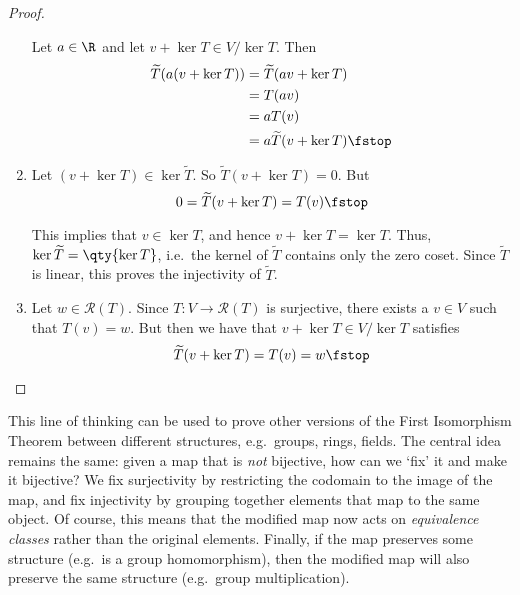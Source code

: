 \begin{proof}
\begin{enumerate}[label=(\roman*)]
     Let \( a\in\R \) and let \( v+\ker T\in V/\ker T \). Then
     \begin{align*}
       \widetilde{T}(a(v+\ker T))&= \widetilde{T}(av+\ker T)\\
       &= T(av)\\
       &= aT(v)\\
       &= a\widetilde{T}(v+\ker T)\fstop
     \end{align*}
   \item Let \( (v+\ker T)\in\ker\widetilde{T} \). So \( \widetilde{T}(v+\ker T)=0 \). But
     \[ 0=\widetilde{T}(v+\ker T)=T(v)\fstop \]

     This implies that \( v\in\ker T \), and hence \( v+\ker T=\ker T \). Thus, \( \ker\widetilde{T}=\qty{\ker T} \), i.e.\ the kernel of \( \widetilde{T} \) contains only the zero coset. Since \( \widetilde{T} \) is linear, this proves the injectivity of \( \widetilde{T} \).
   \item Let \( w\in\mathcal{R}(T) \). Since \( T:V\to\mathcal{R}(T) \) is surjective, there exists a \( v\in V \) such that \( T(v)=w \). But then we have that \( v+\ker T\in V/\ker T \) satisfies
     \[ \widetilde{T}(v+\ker T)=T(v)=w\fstop \]
   \end{enumerate}
 \end{proof}

 This line of thinking can be used to prove other versions of the First Isomorphism Theorem between different structures, e.g.\ groups, rings, fields. The central idea remains the same: given a map that is \emph{not} bijective, how can we `fix' it and make it bijective? We fix surjectivity by restricting the codomain to the image of the map, and fix injectivity by grouping together elements that map to the same object. Of course, this means that the modified map now acts on \emph{equivalence classes} rather than the original elements. Finally, if the map preserves some structure (e.g.\ is a group homomorphism), then the modified map will also preserve the same structure (e.g.\ group multiplication).

 \vspace{3mm}


